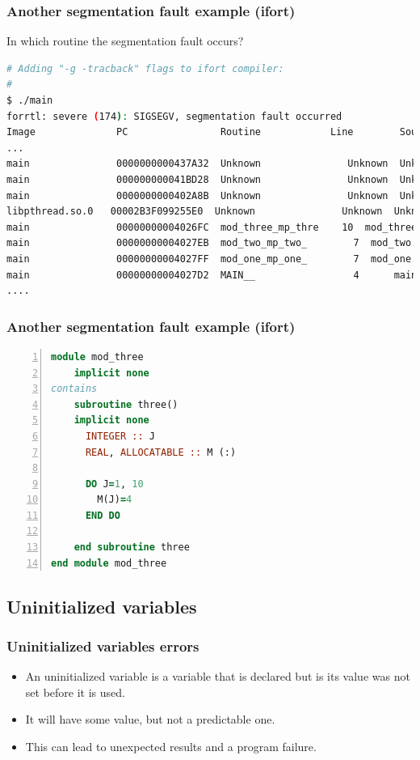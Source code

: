 \documentclass[t]{myBeamer}
\begin{document}
\begin{frame}[fragile,t]
\frametitle{ \huge Another segmentation fault example (ifort)}

\centerline{In which routine the segmentation fault occurs?}

\begin{lstlisting}[language=bash]
# Adding "-g -tracback" flags to ifort compiler:
#
$ ./main
forrtl: severe (174): SIGSEGV, segmentation fault occurred
Image              PC                Routine            Line        Source             
...
main               0000000000437A32  Unknown               Unknown  Unknown
main               000000000041BD28  Unknown               Unknown  Unknown
main               0000000000402A8B  Unknown               Unknown  Unknown
libpthread.so.0   00002B3F099255E0  Unknown               Unknown  Unknown
main               00000000004026FC  mod_three_mp_thre    10  mod_three.f90
main               00000000004027EB  mod_two_mp_two_        7  mod_two.f90
main               00000000004027FF  mod_one_mp_one_        7  mod_one.f90
main               00000000004027D2  MAIN__                 4      main.f90
....
\end{lstlisting}

\end{frame} 

\begin{frame}[fragile,t]
\frametitle{ \huge Another segmentation fault example (ifort)}
\begin{lstlisting}[language=fortran,numbers=left]
module mod_three
    implicit none
contains
    subroutine three()
    implicit none
	  INTEGER :: J
	  REAL, ALLOCATABLE :: M (:)

	  DO J=1, 10
		M(J)=4
	  END DO

    end subroutine three
end module mod_three
\end{lstlisting}

\end{frame} 


\subsection{Uninitialized variables} 
\begin{frame}[t]
\frametitle{ Uninitialized variables errors }
\centering
    
\begin{itemize}
  \item An uninitialized variable is a variable that is declared but is its value was not set before it is used.
  \item It will have some value, but not a predictable one.
  \item This can lead to unexpected results and a program failure.
 \end{itemize}

\end{frame}
\end{document}

